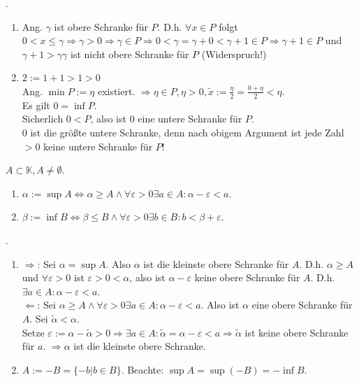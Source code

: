 \documentclass[../ana1.tex]{subfiles}
\begin{document}
				\begin{bew} . %
					\begin{enumerate}
						\item Ang. $\gamma$ ist obere Schranke für $P$. D.h. $\forall x\in P$ folgt $0<x\leq\gamma\Rightarrow\gamma >0\Rightarrow \gamma \in P \Rightarrow 0 < \gamma = \gamma + 0 < \gamma + 1 \in P\Rightarrow\gamma + 1\in P$ und $\gamma +1>\gamma \gamma$ ist nicht obere Schranke für $P$ (Widerspruch!) \Lightning
						\item $2:= 1+1 > 1>0$\\
						      Ang. $\min P := \eta$ existiert. $\Rightarrow \eta \in P, \eta > 0, \tilde{x} := \frac{\eta}{2} = \frac{0 + \eta}{2} < \eta$.\\
						      Es gilt $0 = \inf P$.\\
						      Sicherlich $0<P$, also ist $0$ eine untere Schranke für $P$.\\
						      $0$ ist die größte untere Schranke, denn nach obigem Argument ist jede Zahl $>0$ keine untere Schranke für $P$!
					\end{enumerate}
				\end{bew}
				\begin{lem}
					$A\subset\mathbb{K}, A\neq \emptyset$.
					\begin{enumerate}
						\item $\alpha := \sup A \Leftrightarrow \alpha \geq A \wedge \forall \varepsilon > 0 \exists a \in A: \alpha - \varepsilon < a$.
						\item $\beta := \inf B \Leftrightarrow \beta \leq B \wedge \forall \varepsilon > 0 \exists b \in B: b < \beta + \varepsilon$.
					\end{enumerate}
				\end{lem}
				\begin{bew} .%
					\begin{enumerate}
						\item \glqq $\Rightarrow$\grqq: Sei $\alpha = \sup A$. Also $\alpha$ ist die kleinste obere Schranke für $A$. D.h. $\alpha \geq A$ und $\forall \varepsilon > 0$ ist $\varepsilon>0<\alpha$, also ist $\alpha-\varepsilon$ keine obere Schranke für $A$. D.h. $\exists a\in A:\alpha - \varepsilon <a$.\\
						      \glqq $\Leftarrow$\grqq: Sei $\alpha \geq A \wedge \forall \varepsilon > 0 \exists a \in A: \alpha - \varepsilon < a$. Also ist $\alpha$ eine obere Schranke für $A$. Sei $\tilde{\alpha}<\alpha$.\\
						      Setze $\varepsilon:= \alpha -\tilde{\alpha} > 0 \Rightarrow \exists a \in A: \tilde{\alpha} = \alpha - \varepsilon < a \Rightarrow \tilde{\alpha}$ ist keine obere Schranke für $a$. $\Rightarrow\alpha$ ist die kleinste obere Schranke.
						\item $A:= -B = \{-b|b \in B\}$. Beachte: $\sup A = \sup(-B) = -\inf B$.
					\end{enumerate}
				\end{bew}
\end{document}
